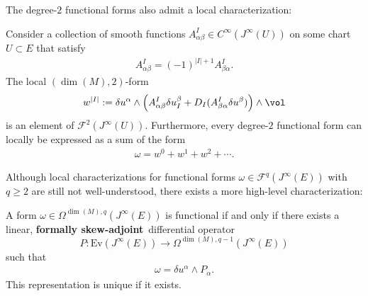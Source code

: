     The degree-$2$ functional forms also admit a local characterization:
    \begin{property}
        Consider a collection of smooth functions $A^I_{\alpha\beta}\in C^\infty(J^\infty(U))$ on some chart $U\subset E$ that satisfy
        \begin{gather}
            A^I_{\alpha\beta} = (-1)^{|I|+1}A^I_{\beta\alpha}.
        \end{gather}
        The local $(\dim(M),2)$-form
        \begin{gather}
            w^{|I|} := \delta u^\alpha\wedge\left(A^I_{\alpha\beta}\delta u^\beta_I + D_I(A^I_{\beta\alpha}\delta u^\beta)\right)\wedge\vol
        \end{gather}
        is an element of $\mathcal{F}^2(J^\infty(U))$. Furthermore, every degree-$2$ functional form can locally be expressed as a sum of the form
        \begin{gather}
            \omega = w^0 + w^1 + w^2 + \cdots.
        \end{gather}
    \end{property}

    Although local characterizations for functional forms $\omega\in\mathcal{F}^q(J^\infty(E))$ with $q\geq2$ are still not well-understood, there exists a more high-level characterization:
    \begin{property}
        A form $\omega\in\Omega^{\dim(M),q}(J^\infty(E))$ is functional if and only if there exists a linear, \textbf{formally skew-adjoint}\footnotemark\ differential operator \[P:\mathrm{Ev}(J^\infty(E))\rightarrow\Omega^{\dim(M),q-1}(J^\infty(E))\] such that
        \begin{gather}
            \omega = \delta u^\alpha\wedge P_\alpha.
        \end{gather}
        This representation is unique if it exists.
    \end{property}

